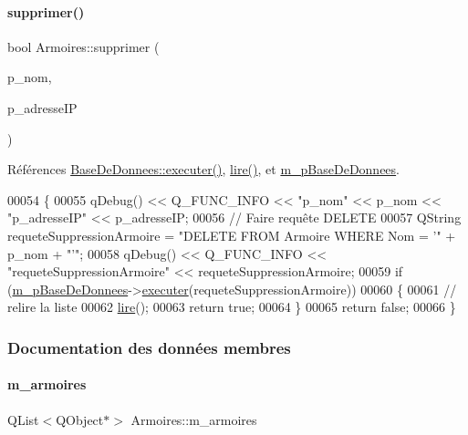\paragraph{\texorpdfstring{supprimer()}{supprimer()}}
{\footnotesize\ttfamily bool Armoires\+::supprimer (\begin{DoxyParamCaption}\item[{Q\+String}]{p\+\_\+nom,  }\item[{Q\+String}]{p\+\_\+adresse\+IP }\end{DoxyParamCaption})}



Références \hyperlink{class_base_de_donnees_aa8de5f8f8bb17edc43f5c0ee33712081}{Base\+De\+Donnees\+::executer()}, \hyperlink{class_armoires_a2b64b3df08cf848d06b4ffb6a49ae858}{lire()}, et \hyperlink{class_armoires_a096a57892eaad473fefc2a20fe4965bd}{m\+\_\+p\+Base\+De\+Donnees}.


\begin{DoxyCode}
00054 \{
00055     qDebug() << Q\_FUNC\_INFO << \textcolor{stringliteral}{"p\_nom"} << p\_nom << \textcolor{stringliteral}{"p\_adresseIP"} << p\_adresseIP;
00056     \textcolor{comment}{// Faire requête DELETE}
00057     QString requeteSuppressionArmoire = \textcolor{stringliteral}{"DELETE FROM Armoire WHERE Nom = '"} + p\_nom + \textcolor{stringliteral}{"'"};
00058     qDebug() << Q\_FUNC\_INFO << \textcolor{stringliteral}{"requeteSuppressionArmoire"} << requeteSuppressionArmoire;
00059     \textcolor{keywordflow}{if} (\hyperlink{class_armoires_a096a57892eaad473fefc2a20fe4965bd}{m\_pBaseDeDonnees}->\hyperlink{class_base_de_donnees_aa8de5f8f8bb17edc43f5c0ee33712081}{executer}(requeteSuppressionArmoire))
00060     \{
00061         \textcolor{comment}{// relire la liste}
00062         \hyperlink{class_armoires_a2b64b3df08cf848d06b4ffb6a49ae858}{lire}();
00063         \textcolor{keywordflow}{return} \textcolor{keyword}{true};
00064     \}
00065     \textcolor{keywordflow}{return} \textcolor{keyword}{false};
00066 \}
\end{DoxyCode}


\subsubsection{Documentation des données membres}
\mbox{\label{class_armoires_a13bc03c96ba9e069bc377f6ea10472ba}} 
\paragraph{\texorpdfstring{m\+\_\+armoires}{m\_armoires}}
{\footnotesize\ttfamily Q\+List$<$Q\+Object$\ast$$>$ Armoires\+::m\+\_\+armoires\hspace{0.3cm}{\ttfamily [private]}}



